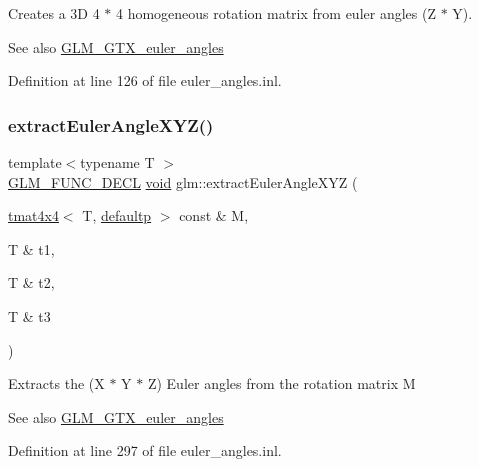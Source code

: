 Creates a 3D 4 $\ast$ 4 homogeneous rotation matrix from euler angles (Z $\ast$ Y). \begin{DoxySeeAlso}{See also}
\mbox{\hyperlink{group__gtx__euler__angles}{G\+L\+M\+\_\+\+G\+T\+X\+\_\+euler\+\_\+angles}} 
\end{DoxySeeAlso}


Definition at line 126 of file euler\+\_\+angles.\+inl.

\mbox{\label{group__gtx__euler__angles_gad5838a4c87ce2b8ee4c4e17bd162fd14}} 
\subsubsection{\texorpdfstring{extractEulerAngleXYZ()}{extractEulerAngleXYZ()}}
{\footnotesize\ttfamily template$<$typename T $>$ \\
\mbox{\hyperlink{setup_8hpp_ab2d052de21a70539923e9bcbf6e83a51}{G\+L\+M\+\_\+\+F\+U\+N\+C\+\_\+\+D\+E\+CL}} \mbox{\hyperlink{glad_8h_a950fc91edb4504f62f1c577bf4727c29}{void}} glm\+::extract\+Euler\+Angle\+X\+YZ (\begin{DoxyParamCaption}\item[{\mbox{\hyperlink{structglm_1_1tmat4x4}{tmat4x4}}$<$ T, \mbox{\hyperlink{namespaceglm_a0f04f086094c747d227af4425893f545a9d21ccd8b5a009ec7eb7677befc3bf51}{defaultp}} $>$ const \&}]{M,  }\item[{T \&}]{t1,  }\item[{T \&}]{t2,  }\item[{T \&}]{t3 }\end{DoxyParamCaption})}

Extracts the (X $\ast$ Y $\ast$ Z) Euler angles from the rotation matrix M \begin{DoxySeeAlso}{See also}
\mbox{\hyperlink{group__gtx__euler__angles}{G\+L\+M\+\_\+\+G\+T\+X\+\_\+euler\+\_\+angles}} 
\end{DoxySeeAlso}


Definition at line 297 of file euler\+\_\+angles.\+inl.

\mbox{\label{group__gtx__euler__angles_ga6f465681cbbc575ad93a53ec918dacf3}} 
